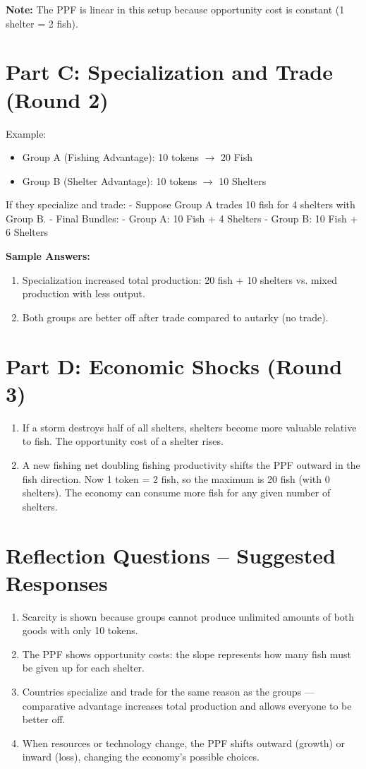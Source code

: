 \documentclass[12pt]{article}
\begin{document}
\noindent \textbf{Note:} The PPF is linear in this setup because opportunity cost is constant (1 shelter = 2 fish).

\section*{Part C: Specialization and Trade (Round 2)}
\noindent Example:  
\begin{itemize}
    \item Group A (Fishing Advantage): 10 tokens $\to$ 20 Fish
    \item Group B (Shelter Advantage): 10 tokens $\to$ 10 Shelters
\end{itemize}

If they specialize and trade:  
- Suppose Group A trades 10 fish for 4 shelters with Group B.  
- Final Bundles:  
  - Group A: 10 Fish + 4 Shelters  
  - Group B: 10 Fish + 6 Shelters  

\noindent \textbf{Sample Answers:}
\begin{enumerate}
    \item Specialization increased total production: 20 fish + 10 shelters vs. mixed production with less output.
    \item Both groups are better off after trade compared to autarky (no trade).
\end{enumerate}

\section*{Part D: Economic Shocks (Round 3)}
\begin{enumerate}
    \item If a storm destroys half of all shelters, shelters become more valuable relative to fish. The opportunity cost of a shelter rises.
    \item A new fishing net doubling fishing productivity shifts the PPF outward in the fish direction. Now 1 token = 2 fish, so the maximum is 20 fish (with 0 shelters). The economy can consume more fish for any given number of shelters.
\end{enumerate}

\section*{Reflection Questions – Suggested Responses}
\begin{enumerate}
    \item Scarcity is shown because groups cannot produce unlimited amounts of both goods with only 10 tokens.
    \item The PPF shows opportunity costs: the slope represents how many fish must be given up for each shelter.
    \item Countries specialize and trade for the same reason as the groups — comparative advantage increases total production and allows everyone to be better off.
    \item When resources or technology change, the PPF shifts outward (growth) or inward (loss), changing the economy’s possible choices.
\end{enumerate}
\end{document}
